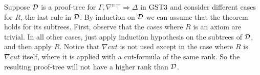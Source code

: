 Suppose $\mathcal{D}$ is a proof-tree for $\Gamma , \nabla^n \top \Rightarrow \Delta$ in $\text{GST3}$ and consider different cases for $R$, the last rule in $\mathcal{D}$.
By induction on $\mathcal{D}$ we can assume that the theorem holds for its subtrees.
First, observe that the cases where $R$ is an axiom are trivial. In all other cases, just apply induction hypothesis on the subtrees of $\mathcal{D}$, and then apply $R$. Notice that $\nabla cut$ is not used except in the case where $R$ is $\nabla cut$ itself, where it is applied with a cut-formula of the same rank. So the resulting proof-tree will not have a higher rank than $\mathcal{D}$.